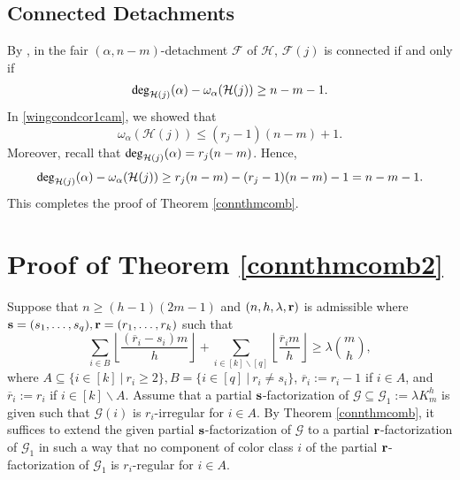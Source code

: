 \documentclass[12pt,oneside]{amsart}
\newcommand\dg{\operatorname{\textup{{\fontfamily{ptm}\selectfont deg}}}}
\newcommand{\cc}{\mathcal}
\newcommand\rounddown[1]{\left\lfloor#1\right\rfloor}
\begin{document}
\subsection{Connected Detachments} By \cite[Theorem 1.1]{2020arXiv200909674B}, in the fair $(\alpha, n-m)$-detachment $\cc F$ of $\cc H$,  $\cc F(j)$ is connected if and only if
\begin{align}
    \dg_{\cc H(j)}(\alpha)-\omega_\alpha(\cc H(j))\geq n-m-1.
\end{align}
In \eqref{wingcondcor1cam}, we showed that
\begin{equation*}
\omega_\alpha(\cc H(j))\leq (r_j-1)(n-m)+1.
\end{equation*}
Moreover, recall that $\dg_{\cc H(j)}(\alpha)=r_j (n-m)$. Hence, 
\begin{align*}
    \dg_{\cc H(j)}(\alpha)-\omega_\alpha(\cc H(j))\geq r_j (n-m)-(r_j-1)(n-m)-1= n-m-1.
\end{align*}
This completes the proof of Theorem \ref{connthmcomb}.
\section{Proof of Theorem \ref{connthmcomb2}}

Suppose that $n \geq (h-1)(2m-1)$ and $(n,h,\lambda, \vb r)$ is admissible where $\vb{s}=(s_1,\dots,s_q), \vb{r}=(r_1,\dots,r_k)$ such that
$$\sum_{i\in B} \rounddown{\frac{(\overline {r}_i-s_i)m}{h}}+\sum_{i\in [k]\backslash [q]} \rounddown{\frac{\overline {r}_i m}{h}} \geq \lambda\binom{m}{h},$$
where $A\subseteq \{i \in [k]\ |\ r_i\geq 2\}, B=\{i\in [q] \ |\ r_i\neq s_i\}$,   $\overline {r}_i:=r_i-1$ if $i\in A$, and  $\overline {r}_i:=r_i$ if $i\in [k]\backslash A$. 
Assume that a partial $\vb{s}$-factorization of $\mathcal G\subseteq \cc G_1:=\lambda K_m^h$ is given such that $\cc G(i)$ is $r_i$-irregular for $i\in A$.
By Theorem \ref{connthmcomb}, it suffices to extend the given partial $\vb{s}$-factorization of $\mathcal G$ to a partial $\vb r$-factorization of $\cc G_1$ in such a way that no component of color class $i$ of the partial $\vb r$-factorization of $\cc G_1$ is $r_i$-regular for $i \in A$.
\end{document}
